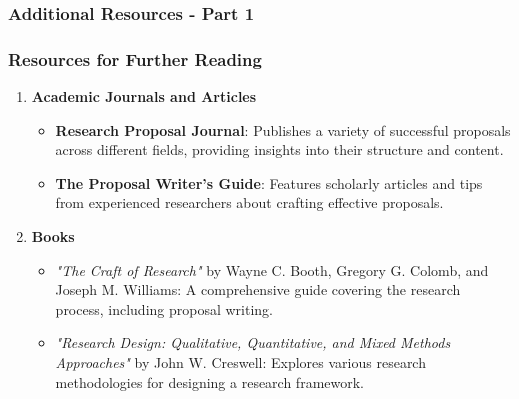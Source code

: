 \documentclass[aspectratio=169]{beamer}
\begin{document}
\begin{frame}[fragile]
    \frametitle{Additional Resources - Part 1}
    \frametitle{Resources for Further Reading}
    \begin{enumerate}
        \item \textbf{Academic Journals and Articles}
        \begin{itemize}
            \item \textbf{Research Proposal Journal}: Publishes a variety of successful proposals across different fields, providing insights into their structure and content.
            \item \textbf{The Proposal Writer's Guide}: Features scholarly articles and tips from experienced researchers about crafting effective proposals.
        \end{itemize}
        
        \item \textbf{Books}
        \begin{itemize}
            \item \textit{"The Craft of Research"} by Wayne C. Booth, Gregory G. Colomb, and Joseph M. Williams: A comprehensive guide covering the research process, including proposal writing.
            \item \textit{"Research Design: Qualitative, Quantitative, and Mixed Methods Approaches"} by John W. Creswell: Explores various research methodologies for designing a research framework.
        \end{itemize}
    \end{enumerate}
\end{frame}
\end{document}
